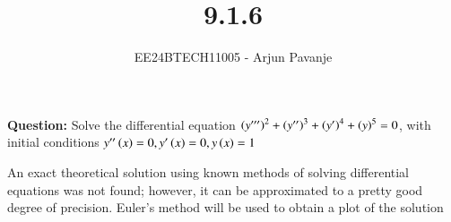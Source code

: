 \documentclass[journal]{IEEEtran}
\begin{document}

\vspace{3cm}

\title{9.1.6}
\author{EE24BTECH11005 - Arjun Pavanje}
{\let\newpage\relax\maketitle}
\textbf{Question: }
Solve the differential equation $\left(y^{\prime \prime \prime}\right)^2 + \left(y^{\prime \prime}\right)^3 + \left(y^{\prime}\right)^4 + \left(y\right)^5 = 0$, with initial conditions $y^{\prime \prime}\left(x\right)=0, y^{\prime}\left(x\right)=0, y\left(x\right)=1$

\solution
An exact theoretical solution using known methods of solving differential equations was not found; however, it can be approximated to a pretty good degree of precision. Euler's method will be used to obtain a plot of the solution\\
\end{document}
